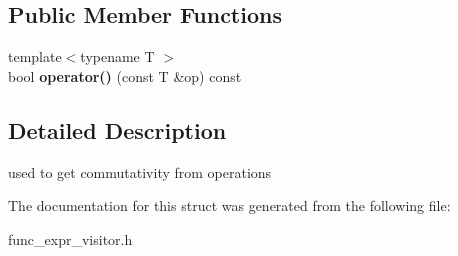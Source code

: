 \subsection*{Public Member Functions}
\begin{DoxyCompactItemize}
\item 
\hypertarget{structcCommuteVisitor_a4ff1aaac656cad3a3ae57a14801245f9}{{\footnotesize template$<$typename T $>$ }\\bool {\bfseries operator()} (const T \&op) const }\label{structcCommuteVisitor_a4ff1aaac656cad3a3ae57a14801245f9}

\end{DoxyCompactItemize}


\subsection{Detailed Description}
used to get commutativity from operations 

The documentation for this struct was generated from the following file\-:\begin{DoxyCompactItemize}
\item 
func\-\_\-expr\-\_\-visitor.\-h\end{DoxyCompactItemize}

